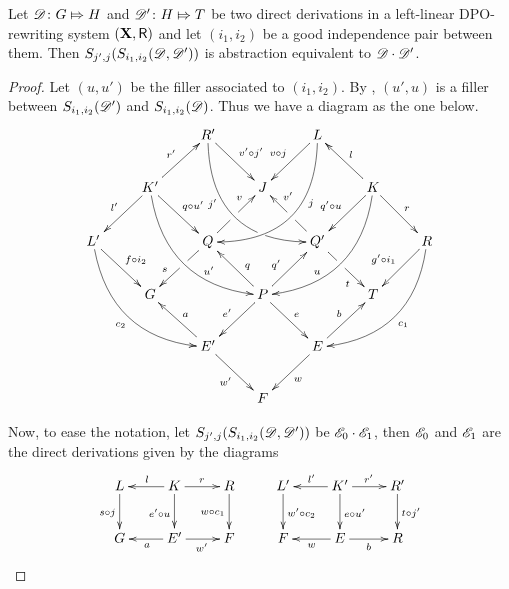 
\begin{lemma}\label{lem:rev}
	Let $\mathscr{D}\colon G\Mapsto H$ and $\mathscr{D}'\colon H\Mapsto T$ be two direct derivations in a left-linear DPO-rewriting system $(\textbf {\textup{X}}, \mathsf{R})$ and let $(i_1,i_2)$ be a good independence pair between them. Then $S_{j',j}(S_{i_1,i_2}(\mathscr{D}, \mathscr{D'}))$ is abstraction equivalent to $\mathscr{D}\cdot \mathscr{D}'$. 
\end{lemma}
\begin{proof}Let $(u,u')$ be the filler associated to $(i_1, i_2)$. By , $(u', u)$ is a filler between $S_{i_1,i_2}(\mathscr{D}')$ and $S_{i_1,i_2}(\mathscr{D})$. Thus we have a diagram as the one below.
		\[\xymatrix{&&R' \ar@/_1cm/[ddrr]_(.35){j'}|(.7)\hole \ar[dr]^{v'\circ j'}&& L \ar@/^1cm/[ddll]^(.35){j}  \ar[dl]_{v\circ j}\\&K'\ar[dr]^{q\circ u'}\ar[dl]_{l'} \ar@/_.8cm/[ddrr]^(.65){u'}\ar[ur]^{r'}&& J && K \ar@/^.8cm/[ddll]_(.65){u}\ar[dl]_{q'\circ u}\ar[lu]_{l} \ar[dr]^{r}\\L' \ar[dr]^{f\circ i_2} \ar@/_.8cm/[ddrr]_{c_2}&& Q \ar[dl]|(.42)\hole_(.64){s}\ar[ur]|(.48)\hole^(.7){v}&&Q' \ar[dr]|(.42)\hole_(.65){t} \ar[ul]|(.48)\hole_(.7){v'}&&R\ar@/^.8cm/[ddll]^{c_1}\ar[dl]_{g'\circ i_1}\\&G &&P\ar[dr]^{e} \ar[dl]_{e'}\ar[ur]^(.4){q'}\ar[ul]_(.4){q}&&T\\&&E' \ar[ul]_{a}\ar[dr]_{w'} &&E\ar[ur]^{b} \ar[dl]^{w}\\&&&F}\]
	
	Now, to ease the notation, let $S_{j',j}(S_{i_1,i_2}(\mathscr{D}, \mathscr{D'}))$ be $\mathscr{E}_0\cdot \mathscr{E}_1$, then $\mathscr{E}_0$ and $\mathscr{E}_1$ are the direct derivations given by the diagrams
	\[\xymatrix{L \ar[d]_{s\circ j}& K\ar[l]_{l} \ar[r]^{r} \ar[d]_{e'\circ u} & R \ar[d]_{w\circ c_1} & L' \ar[d]^{w'\circ c_2}& K' \ar[d]^{e\circ u'} \ar[r]^{r'} \ar[l]_{l'}& R' \ar[d]^{t\circ j'}\\G & E' \ar[l]^{a}  \ar[r]_{w'}& F & F & E \ar[l]^{w} \ar[r]_{b} & R}\]
	

\end{proof}
